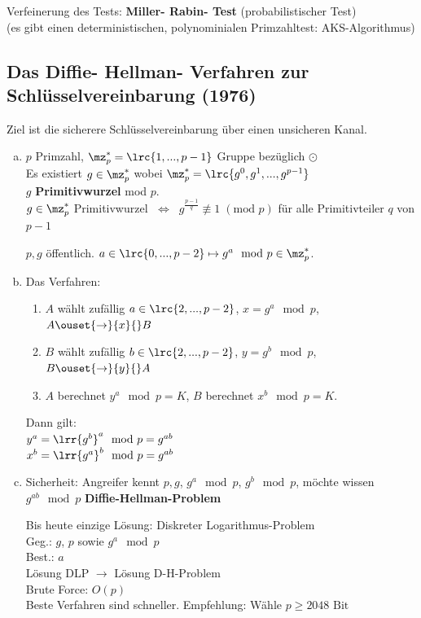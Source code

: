 		Verfeinerung des Tests: \textbf{Miller- Rabin- Test} (probabilistischer Test)\\
		(es gibt einen deterministischen, polynominialen Primzahltest: AKS-Algorithmus)
\newpage
	\subsection{Das Diffie- Hellman- Verfahren zur Schlüsselvereinbarung (1976)}
		Ziel ist die sicherere Schlüsselvereinbarung über einen unsicheren Kanal.
		\begin{enumerate}[a)]
			\item $p$ Primzahl, $\mz_p^*=\lrc{1,...,p-1}$ Gruppe bezüglich $\odot$\\
				Es existiert $g\in\mz_p^*$ wobei $\mz_p^*=\lrc{g^0,g^1,...,g^{p-1}}$\\
				$g$ \textbf{Primitivwurzel} mod $p$.\\
				$g\in\mz_p^*$ Primitivwurzel $\;\Leftrightarrow\;\; g^{\frac{p-1}{q}}\not\equiv 1\; (\mbox{mod } p)$ für alle Primitivteiler $q$ von $p-1$

				$p,g$ öffentlich. $a\in\lrc{0,...,p-2}\mapsto g^a\mod p\in\mz_p^*$.
			\item Das Verfahren:
				\begin{enumerate}[1.]
					\item $A$ wählt zufällig $a\in\lrc{2,...,p-2}$, $x=g^a\mod p$, $A\ouset{\rightarrow}{x}{} B$
					\item $B$ wählt zufällig $b\in\lrc{2,...,p-2}$, $y=g^b\mod p$,
						$B\ouset{\rightarrow}{y}{} A$
					\item $A$ berechnet $y^a\mod p=K$, $B$ berechnet $x^b\mod p=K$.
				\end{enumerate}

				Dann gilt:\\
				$y^a=\lrr{g^b}^a\mod p=g^{ab}$\\
				$x^b=\lrr{g^a}^b\mod p=g^{ab}$
			\item Sicherheit: Angreifer kennt $p,g$, $g^a\mod p$, $g^b\mod p$, möchte wissen $g^{ab}\mod p$ \textbf{Diffie-Hellman-Problem}

				Bis heute einzige Lösung: Diskreter Logarithmus-Problem\\
				Geg.: $g$, $p$ sowie $g^a\mod p$\\
				Best.: $a$\\
				Lösung DLP $\rightarrow$ Lösung D-H-Problem\\
				Brute Force: $O(p)$\\
				Beste Verfahren sind schneller. Empfehlung: Wähle $p\geq 2048\mbox{ Bit}$
		\end{enumerate}
\newpage
